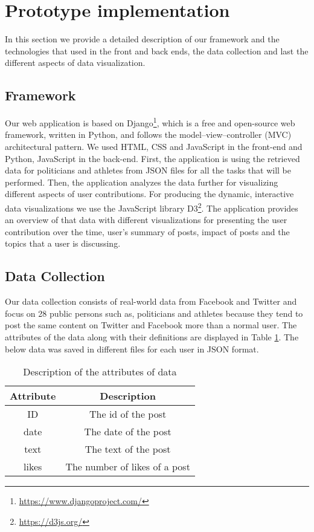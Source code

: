 \section{Prototype implementation}

In this section we provide a detailed description of our framework and the technologies that used in the front and back ends, the data collection and last the different aspects of data visualization.


\subsection{Framework}

Our web application is based on Django\footnote{\url{https://www.djangoproject.com/}}, which is a free and open-source web framework, written in Python, and follows the model–view–controller (MVC) architectural pattern. We used HTML, CSS and JavaScript in the front-end and Python, JavaScript in the back-end. First, the application is using the retrieved data for politicians and athletes from JSON files for all the tasks that will be performed. Then, the application analyzes the data further for visualizing different aspects of user contributions. For producing the dynamic, interactive data visualizations we use the JavaScript library D3\footnote{\url{https://d3js.org/}}.
The application provides an overview of that data with different visualizations for presenting the user contribution over the time, user's summary of posts, impact of posts and the topics that a user is discussing.


\subsection{Data Collection}

Our data collection consists of real-world data from Facebook 
and Twitter and focus on 28 public persons such as, politicians 
and athletes because they tend to post the same content on Twitter and Facebook more than a normal user. The attributes of the data along with their definitions are displayed in Table \ref{table:attrib_des}. The below data was saved in different files for each user in JSON format.

\begin{table}[ht] 
\caption{Description of the attributes of data} 
\centering  
\begin{tabular}{c | c} 
\hline\hline 
Attribute & Description \\ [0.5ex] 
\hline 
ID & The id of the post \\ 
date & The date of the post \\ 
text & The text of the post\\ 
likes & The number of likes of a post \\ [1ex]  
\hline  
\end{tabular} 
\label{table:attrib_des}
\end{table}

